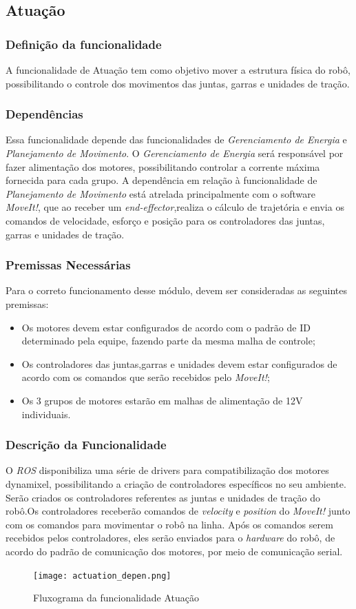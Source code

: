 \subsection{Atuação }
\label{ssec:actu}
\subsubsection{Definição da funcionalidade}
A funcionalidade de Atuação tem como objetivo mover a estrutura física do robô, possibilitando o controle dos movimentos das juntas, garras e unidades de tração.
\subsubsection{Dependências}
Essa funcionalidade depende das funcionalidades de \textit{Gerenciamento de Energia} e \textit{Planejamento de Movimento}. O \textit{Gerenciamento de Energia} será responsável por fazer alimentação dos motores, possibilitando controlar a corrente máxima fornecida para cada grupo.
A dependência em relação à funcionalidade de \textit{Planejamento de Movimento} está atrelada principalmente com o software \textit{MoveIt!}, que ao receber um \textit{end-effector},realiza o cálculo de trajetória e envia os comandos de velocidade, esforço e posição para os controladores das juntas, garras e unidades de tração.

\subsubsection{Premissas Necessárias}
Para o correto funcionamento desse módulo, devem ser consideradas as seguintes premissas:
\begin{itemize}
	\item Os motores devem estar configurados de acordo com o padrão de ID determinado pela equipe, fazendo parte da mesma malha de controle;
	\item Os controladores das juntas,garras e unidades devem estar configurados de acordo com os comandos que serão recebidos pelo\textit{ MoveIt!};
	\item Os 3 grupos de motores estarão em malhas de alimentação de 12V individuais.
\end{itemize}
\subsubsection{Descrição da Funcionalidade}
O \textit{ROS} disponibiliza uma série de drivers para compatibilização dos motores dynamixel, possibilitando a criação de controladores específicos no seu ambiente. Serão criados os controladores referentes as juntas e unidades de tração do robô.Os controladores receberão comandos de \textit{velocity} e \textit{position} do \textit{MoveIt!} junto com os comandos para movimentar o robô na linha.
Após os comandos serem recebidos pelos controladores, eles serão enviados para o \textit{hardware} do robô, de acordo do padrão de comunicação dos motores, por meio de comunicação serial. 
\begin{figure}[h]
	\centering
	\texttt{[image: actuation\_depen.png]}
	\caption{Fluxograma da funcionalidade Atuação}
	\label{fig:depen_actuation}
\end{figure}
